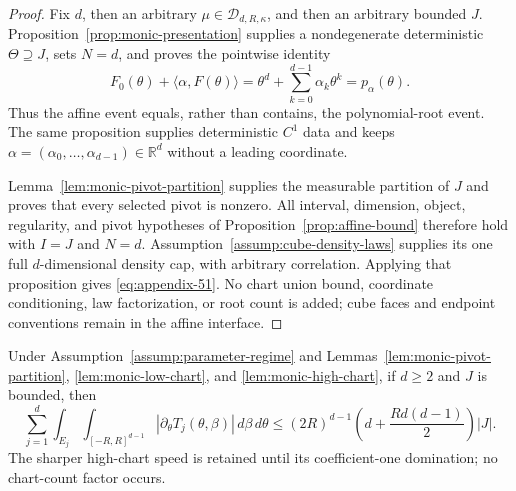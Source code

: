 \begin{proof}
Fix $d$, then an arbitrary $\mu\in\mathcal D_{d,R,\kappa}$, and then an
arbitrary bounded $J$.  Proposition~\ref{prop:monic-presentation} supplies a
nondegenerate deterministic $\Theta\supseteq J$, sets $N=d$, and proves the
pointwise identity
\begin{equation}
F_0(\theta)+\langle\alpha,F(\theta)\rangle
=\theta^d+\sum_{k=0}^{d-1}\alpha_k\theta^k
=p_\alpha(\theta).
\label{eq:appendix-52}
\end{equation}
Thus the affine event equals, rather than contains, the polynomial-root
event.  The same proposition supplies deterministic $C^1$ data and keeps
$\alpha=(\alpha_0,\ldots,\alpha_{d-1})\in\mathbb R^d$ without a leading
coordinate.

Lemma~\ref{lem:monic-pivot-partition} supplies the measurable partition of
$J$ and proves that every selected pivot is nonzero.  All interval,
dimension, object, regularity, and pivot hypotheses of
Proposition~\ref{prop:affine-bound} therefore hold with $I=J$ and $N=d$.
Assumption~\ref{assump:cube-density-laws} supplies its one full
$d$-dimensional density cap, with arbitrary correlation.  Applying that
proposition gives \eqref{eq:appendix-51}.  No chart union bound, coordinate conditioning,
law factorization, or root count is added; cube faces and endpoint
conventions remain in the affine interface.
\end{proof}

\begin{lemma}
\label{lem:monic-two-cell-ledger}
Under Assumption~\ref{assump:parameter-regime} and
Lemmas~\ref{lem:monic-pivot-partition},
\ref{lem:monic-low-chart}, and
\ref{lem:monic-high-chart}, if $d\geq2$ and $J$ is bounded, then
\begin{equation}
\sum_{j=1}^d\int_{E_j}\int_{[-R,R]^{d-1}}
|\partial_\theta T_j(\theta,\beta)|\,d\beta\,d\theta
\leq(2R)^{d-1}
\left(d+\frac{Rd(d-1)}2\right)|J|.
\label{eq:appendix-53}
\end{equation}
The sharper high-chart speed is retained until its coefficient-one
domination; no chart-count factor occurs.
\end{lemma}

